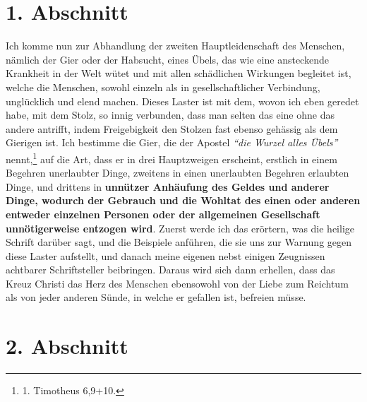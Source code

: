 \newpage

\section{1. Abschnitt} \label{kap13_ab1}

Ich komme nun zur Abhandlung der zweiten Hauptleidenschaft des Menschen, nämlich
der Gier oder der Habsucht, eines Übels, das wie
eine ansteckende Krankheit
in der Welt wütet und mit allen schädlichen Wirkungen begleitet ist, welche
die Menschen, sowohl einzeln als in gesellschaftlicher Verbindung, unglücklich
und elend machen. Dieses Laster ist mit dem, wovon ich eben geredet habe, mit
dem Stolz, so innig verbunden, dass man selten das eine ohne das andere
antrifft, indem Freigebigkeit den Stolzen fast ebenso gehässig als dem
Gierigen ist. Ich bestimme die Gier, die der Apostel
\textit{"`die Wurzel alles
Übels"'} nennt,\footnote{1. Timotheus 6,9+10.}
auf die Art, dass er in drei
Hauptzweigen erscheint, erstlich in einem Begehren unerlaubter Dinge, zweitens
in einen unerlaubten Begehren erlaubten Dinge, und drittens in
\label{ref:13_01_accumlation} \textbf{unnützer
Anhäufung des Geldes und anderer Dinge, wodurch der Gebrauch und die Wohltat
des einen oder anderen entweder einzelnen Personen oder der allgemeinen
Gesellschaft unnötigerweise entzogen wird}. Zuerst
werde ich das erörtern, was
die heilige Schrift darüber sagt, und die Beispiele anführen, die sie uns zur
Warnung gegen diese Laster aufstellt, und danach meine eigenen nebst einigen
Zeugnissen achtbarer Schriftsteller beibringen. Daraus wird sich dann erhellen, dass
das Kreuz Christi das Herz des Menschen ebensowohl von der Liebe zum Reichtum
als von jeder anderen Sünde, in welche er gefallen ist, befreien müsse.

\section{2. Abschnitt} \label{kap13_ab2}


